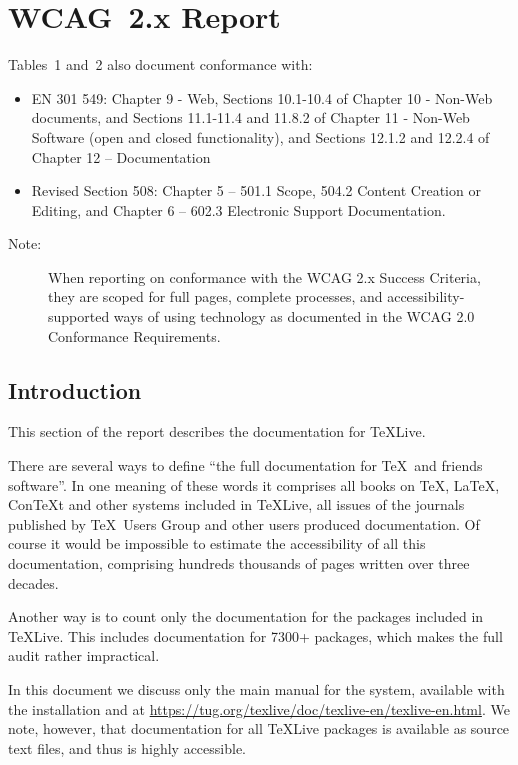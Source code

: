 \documentclass{report}
\begin{document}
\clearpage
\section{WCAG~2.x Report}
\label{sec:wcag}

Tables~1 and~2 also document conformance with:
\begin{itemize}
\item EN 301 549:  Chapter 9 - Web, Sections 10.1-10.4 of Chapter 10 - Non-Web documents, and Sections 11.1-11.4 and 11.8.2 of Chapter 11 - Non-Web Software (open and closed functionality), and Sections 12.1.2 and 12.2.4 of Chapter 12 – Documentation
\item Revised Section 508: Chapter 5 – 501.1 Scope, 504.2 Content
  Creation or Editing, and Chapter 6 – 602.3 Electronic Support
  Documentation.
\end{itemize}

\begin{description}
\item[Note:] When reporting on conformance with the WCAG 2.x Success
  Criteria, they are scoped for full pages, complete processes, and
  accessibility-supported ways of using technology as documented in
  the WCAG 2.0 Conformance Requirements.
\end{description}

\subsection{Introduction}
\label{sec:wcag-intro}

This section of the report describes the documentation for \TeX Live.

There are several ways to define ``the full documentation for \TeX\
and friends software''.  In one meaning of these words it comprises
all books on \TeX, \LaTeX, Con\TeX t and other systems included in
\TeX Live, all issues of the journals published by \TeX\ Users Group
and other users produced documentation.  Of course it would be
impossible to estimate the accessibility of all this documentation,
comprising hundreds thousands of pages written over three decades.

Another way is to count only the documentation for the packages
included in \TeX Live.  This includes documentation for 7300+
packages, which makes the full audit rather impractical.

In this document we discuss only the main manual for the system,
available with the installation and at
\url{https://tug.org/texlive/doc/texlive-en/texlive-en.html}.  We
note, however, that documentation for all \TeX Live packages is
available as source text files, and thus is highly accessible.  
\end{document}
